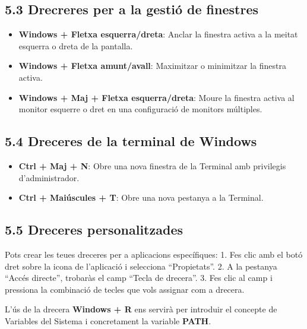 \documentclass[
  a4paper,
]{article}
\providecommand{\tightlist}{%
  \setlength{\itemsep}{0pt}\setlength{\parskip}{0pt}}
\begin{document}
\subsection{5.3 Drecreres per a la gestió de
finestres}\label{drecreres-per-a-la-gestiuxf3-de-finestres}

\begin{itemize}
\tightlist
\item
  \textbf{Windows + Fletxa esquerra/dreta}: Anclar la finestra activa a
  la meitat esquerra o dreta de la pantalla.
\item
  \textbf{Windows + Fletxa amunt/avall}: Maximitzar o minimitzar la
  finestra activa.
\item
  \textbf{Windows + Maj + Fletxa esquerra/dreta}: Moure la finestra
  activa al monitor esquerre o dret en una configuració de monitors
  múltiples.
\end{itemize}

\subsection{5.4 Dreceres de la terminal de
Windows}\label{dreceres-de-la-terminal-de-windows}

\begin{itemize}
\tightlist
\item
  \textbf{Ctrl + Maj + N}: Obre una nova finestra de la Terminal amb
  privilegis d'administrador.
\item
  \textbf{Ctrl + Maiúscules + T}: Obre una nova pestanya a la Terminal.
\end{itemize}

\subsection{5.5 Dreceres
personalitzades}\label{dreceres-personalitzades}

Pots crear les teues dreceres per a aplicacions específiques: 1. Fes
clic amb el botó dret sobre la icona de l'aplicació i selecciona
``Propietats''. 2. A la pestanya ``Accés directe'', trobaràs el camp
``Tecla de drecera''. 3. Fes clic al camp i pressiona la combinació de
tecles que vols assignar com a drecera.

L'ús de la drecera \textbf{Windows + R} ens servirà per introduir el
concepte de Variables del Sistema i concretament la variable
\textbf{PATH}.
\end{document}

